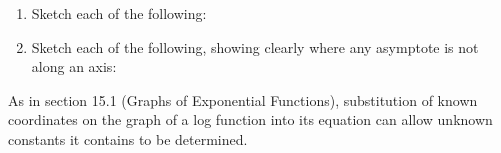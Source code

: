 \documentclass[
  11pt,
  openany]{book}
\begin{document}
\vspace{-0.5cm}

\begin{enumerate}
    \item Sketch each of the following:
    \begin{enumerate}
    \end{enumerate}
    \item Sketch each of the following, showing clearly where any asymptote is not along an axis:
    \begin{enumerate}
    \end{enumerate}
\end{enumerate}

\pagebreak

As in section 15.1 (Graphs of Exponential Functions), substitution of known coordinates on the graph of a log function into its equation can allow unknown constants it contains to be determined.
\end{document}
